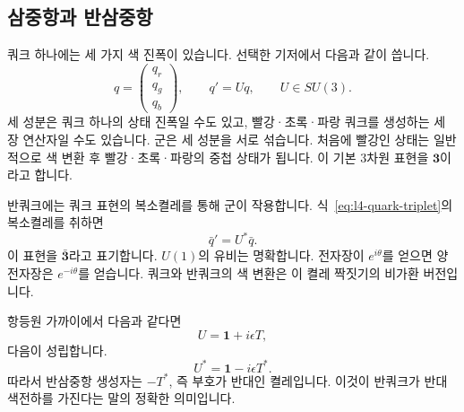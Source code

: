 \subsection{삼중항과 반삼중항}

쿼크 하나에는 세 가지 색 진폭이 있습니다. 선택한 기저에서 다음과 같이 씁니다.
\begin{equation}
q=
\begin{pmatrix}
q_r\\q_g\\q_b
\end{pmatrix},
\qquad
q'=Uq,
\qquad U\in SU(3).
\label{eq:l4-quark-triplet}
\end{equation}
세 성분은 쿼크 하나의 상태 진폭일 수도 있고, 빨강·초록·파랑 쿼크를 생성하는 세 장 연산자일 수도 있습니다. 군은 세 성분을 서로 섞습니다. 처음에 빨강인 상태는 일반적으로 색 변환 후 빨강·초록·파랑의 중첩 상태가 됩니다. 이 기본 3차원 표현을 \(\boldsymbol 3\)이라고 합니다.

반쿼크에는 쿼크 표현의 복소켤레를 통해 군이 작용합니다. 식~\eqref{eq:l4-quark-triplet}의 복소켤레를 취하면
\begin{equation}
\bar q'=U^*\bar q.
\end{equation}
이 표현을 \(\bar{\boldsymbol 3}\)라고 표기합니다. \(U(1)\)의 유비는 명확합니다. 전자장이 \(e^{i\theta}\)를 얻으면 양전자장은 \(e^{-i\theta}\)를 얻습니다. 쿼크와 반쿼크의 색 변환은 이 켤레 짝짓기의 비가환 버전입니다.

항등원 가까이에서 다음과 같다면
\begin{equation}
U=\boldsymbol 1+i\epsilon T,
\end{equation}
다음이 성립합니다.
\begin{equation}
U^*=\boldsymbol 1-i\epsilon T^*.
\end{equation}
따라서 반삼중항 생성자는 \(-T^*\), 즉 부호가 반대인 켤레입니다. 이것이 반쿼크가 반대 색전하를 가진다는 말의 정확한 의미입니다.

\begin{classroomqa}
\end{classroomqa}

